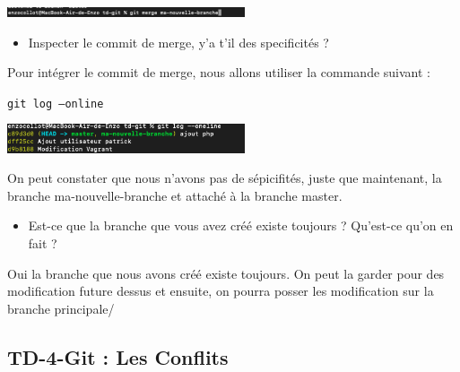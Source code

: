 \documentclass[12pt]{article}
\begin{document}
\begin{center}
  \includegraphics[width=7cm]{Image-TD-Git-3/git-merge.png}
\end{center}

\vspace{0.3cm}

\begin{itemize}
  \item Inspecter le commit de merge, y'a t'il des specificités ?
\end{itemize}

\vspace{0.3cm}

Pour intégrer le commit de merge, nous allons utiliser la commande suivant : 

\texttt{git log --online}

\vspace{0.3cm}

\begin{center}
  \includegraphics[width=7cm]{Image-TD-Git-3/git-log.png}
\end{center}

\vspace{0.3cm}

On peut constater que nous n'avons pas de sépicifités, juste que maintenant, la branche ma-nouvelle-branche et attaché à la branche master.

\vspace{0.3cm}

\begin{itemize}
  \item Est-ce que la branche que vous avez créé existe toujours ? Qu'est-ce qu'on en fait ?
\end{itemize}

\vspace{0.3cm}

Oui la branche que nous avons créé existe toujours. On peut la garder pour des modification future dessus et ensuite, on pourra posser les modification sur la branche principale/

\newpage

\subsection{TD-4-Git : Les Conflits}
\end{document}
